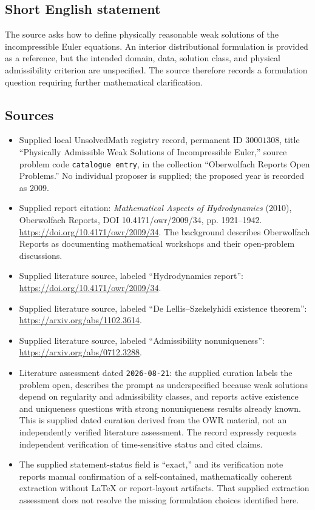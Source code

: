 \documentclass[11pt]{article}
\begin{document}
\subsection{Short English statement}
The source asks how to define physically reasonable weak solutions of the incompressible Euler equations. An interior distributional formulation is provided as a reference, but the intended domain, data, solution class, and physical admissibility criterion are unspecified. The source therefore records a formulation question requiring further mathematical clarification.
\subsection{Sources}
\begin{itemize}
\item Supplied local UnsolvedMath registry record, permanent ID \(30001308\), title ``Physically Admissible Weak Solutions of Incompressible Euler,'' source problem code \texttt{catalogue entry}, in the collection ``Oberwolfach Reports Open Problems.'' No individual proposer is supplied; the proposed year is recorded as 2009.
\item Supplied report citation: \emph{Mathematical Aspects of Hydrodynamics} (2010), Oberwolfach Reports, DOI 10.4171/owr/2009/34, pp. 1921--1942. \url{https://doi.org/10.4171/owr/2009/34}. The background describes Oberwolfach Reports as documenting mathematical workshops and their open-problem discussions.
\item Supplied literature source, labeled ``Hydrodynamics report'': \url{https://doi.org/10.4171/owr/2009/34}.
\item Supplied literature source, labeled ``De Lellis--Szekelyhidi existence theorem'': \url{https://arxiv.org/abs/1102.3614}.
\item Supplied literature source, labeled ``Admissibility nonuniqueness'': \url{https://arxiv.org/abs/0712.3288}.
\item Literature assessment dated \texttt{2026-08-21}: the supplied curation labels the problem open, describes the prompt as underspecified because weak solutions depend on regularity and admissibility classes, and reports active existence and uniqueness questions with strong nonuniqueness results already known. This is supplied dated curation derived from the OWR material, not an independently verified literature assessment. The record expressly requests independent verification of time-sensitive status and cited claims.
\item The supplied statement-status field is ``exact,'' and its verification note reports manual confirmation of a self-contained, mathematically coherent extraction without LaTeX or report-layout artifacts. That supplied extraction assessment does not resolve the missing formulation choices identified here.
\end{itemize}
\end{document}
